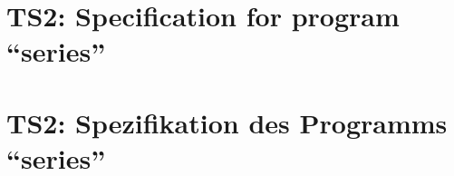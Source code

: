 \parindent0pt

\thispagestyle{empty}
\ifenglish
\section*{TS2: Specification for program ``series''}

\fi
\ifgerman
\section*{TS2: Spezifikation des Programms ``series''}

\fi



